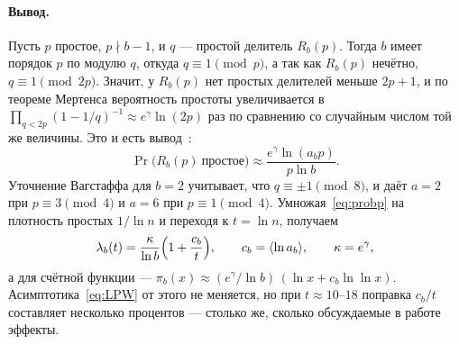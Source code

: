 \documentclass[11pt,a4paper]{article}
\theoremstyle{plain}
\theoremstyle{remark}
\newcommand{\Rb}{R_b}
\newcommand{\eg}{e^{\gamma}}
\begin{document}
\paragraph{Вывод.} Пусть $p$ простое, $p\nmid b-1$, и $q$ --- простой делитель
$\Rb(p)$. Тогда $b$ имеет порядок $p$ по модулю $q$, откуда $q\equiv1\pmod p$, а
так как $\Rb(p)$ нечётно, $q\equiv1\pmod{2p}$. Значит, у $\Rb(p)$ нет простых
делителей меньше $2p+1$, и по теореме Мертенса вероятность простоты
увеличивается в $\prod_{q<2p}(1-1/q)^{-1}\approx\eg\ln(2p)$ раз по сравнению со
случайным числом той же величины. Это и есть вывод~\cite{wagstaff1983,t5k}:
\begin{equation}\label{eq:probp}
\Pr\bigl(\Rb(p)\ \text{простое}\bigr)\approx\frac{\eg\ln(a_bp)}{p\ln b}.
\end{equation}
Уточнение Вагстаффа для $b=2$ учитывает, что $q\equiv\pm1\pmod8$, и даёт $a=2$ при
$p\equiv3\pmod4$ и $a=6$ при $p\equiv1\pmod4$. Умножая~\eqref{eq:probp} на
плотность простых $1/\ln n$ и переходя к $t=\ln n$, получаем
\begin{equation}\label{eq:lam2}
\lambda_b(t)=\frac{\kappa}{\ln b}\Bigl(1+\frac{c_b}{t}\Bigr),\qquad
c_b=\langle\ln a_b\rangle,\qquad \kappa=\eg,
\end{equation}
а для счётной функции --- $\pi_b(x)\approx(\eg/\ln b)\,(\ln x+c_b\ln\ln x)$.
Асимптотика~\eqref{eq:LPW} от этого не меняется, но при $t\approx10$--$18$ поправка
$c_b/t$ составляет несколько процентов --- столько же, сколько обсуждаемые в работе
эффекты.
\end{document}
